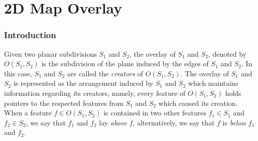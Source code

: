 



\chapter{2D Map Overlay}
\label{chap:map_overlay_2_ref}
\subsection*{Introduction}
Given two planar subdivisions $S_1$ and $S_2$, the overlay of 
$S_1$ and $S_2$, denoted by $O(S_1,S_2)$ is the subdivision 
of the plane induced by the edges of $S_1$ and $S_2$.
In this case, $S_1$ and $S_2$ are called the {\em creators} 
of $O(S_1,S_2)$. The overlay of $S_1$ and $S_2$ is represented as the 
arrangement induced by $S_1$ and $S_2$ which maintains information 
regarding its creators, namely, every feature of $O(S_1,S_2)$ holds pointers 
to the respected features from $S_1$ and $S_2$ which caused its creation.
When a feature $f \in O(S_1,S_2)$ is contained in two other features 
$f_1 \in S_1$ and $f_2 \in S_2$, we say that $f_1$ and $f_2$ 
lay {\em above} $f$, alternatively, we say that 
$f$ is {\em below} $f_1$ and $f_2$.

